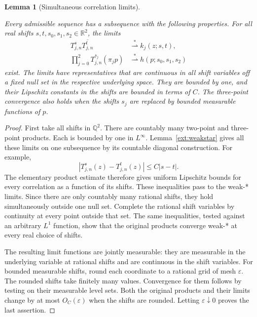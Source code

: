 \documentclass[11pt]{amsart}
\newcommand{\R}{\mathbb R}
\newtheorem{lemma}[theorem]{Lemma}
\theoremstyle{definition}
\theoremstyle{remark}
\numberwithin{equation}{section}
\providecommand{\lean}[1]{}
\providecommand{\leanok}{}
\begin{document}
\begin{lemma}[Simultaneous correlation limits]\label{ann:extract}
\lean{Auto.ann_extract}
\leanok
Every admissible sequence has a subsequence with the following properties.
For all real shifts $s,t,s_0,s_1,s_2\in\R^2$, the limits
\begin{align*}
 T^s_{j,n}\overline{T^t_{j,n}}&\stackrel{*}{\rightharpoonup}
 k_j(z;s,t),\\
 \prod_{j=0}^2T^{s_j}_{j,n}(\pi_jp)
 &\stackrel{*}{\rightharpoonup}h(p;s_0,s_1,s_2)
\end{align*}
exist. The limits have representatives that are continuous in all shift
variables off a fixed null set in the respective underlying space.
They are bounded by one, and their Lipschitz constants in the shifts
are bounded in terms of $C$. The three-point convergence also holds
when the shifts $s_j$ are replaced by bounded measurable functions of $p$.
\end{lemma}
\begin{proof}
First take all shifts in $\mathbb Q^2$. There are countably many
two-point and three-point products. Each is bounded by one in
$L^\infty$. Lemma~\ref{ext:weakstar} gives all these limits on one
subsequence by its countable diagonal construction.
For example,
\[
 |T^s_{j,n}(z)-T^t_{j,n}(z)|\le C|s-t|.
\]
The elementary product estimate therefore gives uniform Lipschitz
bounds for every correlation as a function of its shifts. These
inequalities pass to the weak-* limits. Since there are only
countably many rational shifts, they hold simultaneously outside
one null set. Complete the rational shift variables by continuity
at every point outside that set. The same inequalities, tested
against an arbitrary $L^1$ function, show that the original products
converge weak-* at every real choice of shifts.

The resulting limit functions are jointly measurable: they are
measurable in the underlying variable at rational shifts and are
continuous in the shift variables. For bounded measurable shifts,
round each coordinate to a rational grid of mesh $\varepsilon$.
The rounded shifts take finitely many values. Convergence for them
follows by testing on their measurable level sets. Both the original
products and their limits change by at most $O_C(\varepsilon)$ when
the shifts are rounded. Letting $\varepsilon\downarrow0$ proves the
last assertion.
\end{proof}
\end{document}
